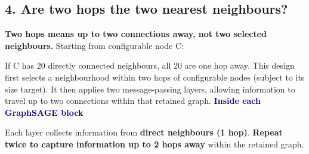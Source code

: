 \documentclass[11pt,a4paper]{article}
\begin{document}
\subsection*{4. Are two hops the two nearest neighbours?}
\textbf{Two hops means up to two connections away, not two selected neighbours.}
Starting from configurable node C:
\begin{center}
\end{center}
If C has 20 directly connected neighbours, all 20 are one hop away.
This design first selects a neighbourhood within two hops of configurable nodes
(subject to its size target). It then applies two message-passing layers, allowing
information to travel up to two connections within that retained graph.
\newpage
{\LARGE\bfseries\textcolor{navy}{Inside each GraphSAGE block}}\par
Each layer collects information from \textbf{direct neighbours (1 hop)}.
\textbf{Repeat twice to capture information up to 2 hops away} within the retained graph.
\end{document}
